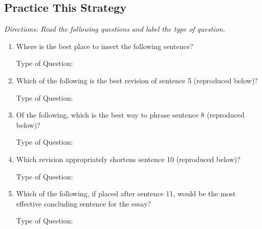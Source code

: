\subsection{Practice This Strategy}
\textit{Directions: Read the following questions and label the type of question.}

\begin{enumerate}
\item Where is the best place to insert the following sentence?

Type of Question: \hrulefill

\item Which of the following is the best revision of sentence 5 (reproduced below)?

Type of Question: \hrulefill

\item Of the following, which is the best way to phrase sentence 8 (reproduced below)?

Type of Question: \hrulefill

\item Which revision appropriately shortens sentence 10 (reproduced below)?

Type of Question: \hrulefill

\item Which of the following, if placed after sentence 11, would be the most effective concluding sentence for the essay?

Type of Question: \hrulefill
\end{enumerate}

